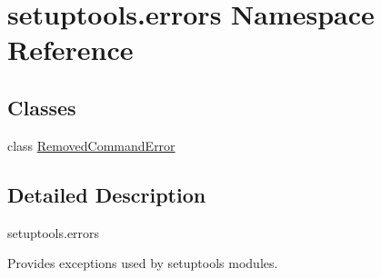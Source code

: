 \hypertarget{namespacesetuptools_1_1errors}{}\section{setuptools.\+errors Namespace Reference}
\label{namespacesetuptools_1_1errors}
\subsection*{Classes}
\begin{DoxyCompactItemize}
\item 
class \hyperlink{classsetuptools_1_1errors_1_1RemovedCommandError}{Removed\+Command\+Error}
\end{DoxyCompactItemize}


\subsection{Detailed Description}
\begin{DoxyVerb}setuptools.errors

Provides exceptions used by setuptools modules.
\end{DoxyVerb}
 